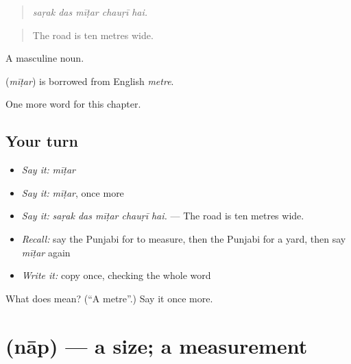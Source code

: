 \begin{quote}
    
\end{quote}

\begin{quote}
\emph{saṛak das mīṭar chauṛī hai.}
\end{quote}

\begin{quote}
The road is ten metres wide.
\end{quote}

A masculine noun.

\begin{cousinweb}
\textbf{} (\emph{mīṭar}) is borrowed from English \emph{metre}.
\end{cousinweb}

\begin{grammarlens}[title={What you've built}]
One more word for this chapter.
\end{grammarlens}

\subsection*{Your turn}
\begin{itemize}
\raggedright
  \item \emph{Say it:} \emph{mīṭar}
  \item \emph{Say it:} \emph{mīṭar}, once more
  \item \emph{Say it:} \emph{saṛak das mīṭar chauṛī hai.} — The road is ten metres wide.
  \item \emph{Recall:} say the Punjabi for to measure, then the Punjabi for a yard, then say \emph{mīṭar} again
  \item \emph{Write it:} copy \textbf{} once, checking the whole word
\end{itemize}

\begin{tcolorbox}[breakable,colback=teal!4,colframe=teal!35!black,title={Before you move on}]
What does  mean? (\textquotedblleft{}A metre\textquotedblright{}.) Say it once more.
\end{tcolorbox}
\section[\texorpdfstring{\pa{ਨਾਪ} (nāp)}{ਨਾਪ (nāp)}]{ (nāp) — a size; a measurement}

\label{lesson:PA-C274-nap}



